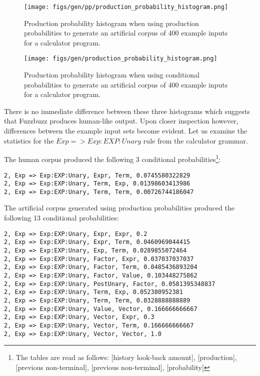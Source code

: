 \begin{figure*}
    \begin{center}

\texttt{[image: figs/gen/pp/production\_probability\_histogram.png]}
    \end{center}
        \caption{Production probability histogram when using production
probabilities
to generate an artificial corpus of 400 example inputs for a calculator
program.}
    \label{times}
\end{figure*}

\begin{figure*}
    \begin{center}

\texttt{[image: figs/gen/production\_probability\_histogram.png]}
    \end{center}
        \caption{Production probability histogram when using conditional
probabilities to generate an artificial corpus of 400 example inputs for a
calculator program.}
    \label{times}
\end{figure*}


There is no immediate difference between these three histograms which
suggests that Fuzzbuzz produces human-like output. Upon closer inspection
however, differences between the example input sets become evident. Let us
examine the statistics for the $Exp => Exp:EXP:Unary$ rule from the calculator
grammar.

The human corpus produced the following 3 conditional
probabilities\footnote{The tables are read as follows: [history look-back
amount], [production], [previous non-terminal], [previous non-terminal],
[probability]}: \\

\noindent
\begin{verbatim}
2, Exp => Exp:EXP:Unary, Expr, Term, 0.0745580322829
2, Exp => Exp:EXP:Unary, Term, Exp, 0.01398603413986
2, Exp => Exp:EXP:Unary, Term, Term, 0.00726744186047
\end{verbatim}


The artificial corpus generated using production probabilities produced the
following 13 conditional probabilities: \\

\noindent
\begin{verbatim}
2, Exp => Exp:EXP:Unary, Expr, Expr, 0.2
2, Exp => Exp:EXP:Unary, Expr, Term, 0.0460969044415
2, Exp => Exp:EXP:Unary, Exp, Term, 0.0289855072464
2, Exp => Exp:EXP:Unary, Factor, Expr, 0.037037037037
2, Exp => Exp:EXP:Unary, Factor, Term, 0.0485436893204
2, Exp => Exp:EXP:Unary, Factor, Value, 0.103448275862
2, Exp => Exp:EXP:Unary, PostUnary, Factor, 0.0581395348837
2, Exp => Exp:EXP:Unary, Term, Exp, 0.052380952381
2, Exp => Exp:EXP:Unary, Term, Term, 0.0328888888889
2, Exp => Exp:EXP:Unary, Value, Vector, 0.166666666667
2, Exp => Exp:EXP:Unary, Vector, Expr, 0.3
2, Exp => Exp:EXP:Unary, Vector, Term, 0.166666666667
2, Exp => Exp:EXP:Unary, Vector, Vector, 1.0
\end{verbatim}

